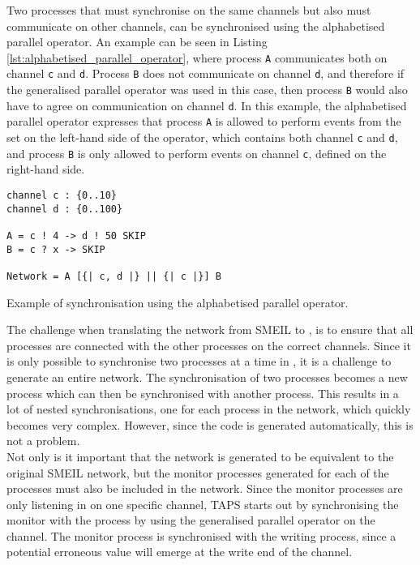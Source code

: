 Two processes that must synchronise on the same channels but also must communicate on other channels, can be synchronised using the alphabetised parallel operator. An example can be seen in Listing \ref{lst:alphabetised_parallel_operator}, where process \texttt{A} communicates both on channel \texttt{c} and \texttt{d}. Process \texttt{B} does not communicate on channel \texttt{d}, and therefore if the generalised parallel operator was used in this case, then process \texttt{B} would also have to agree on communication on channel \texttt{d}. In this example, the alphabetised parallel operator expresses that process \texttt{A} is allowed to perform events from the set on the left-hand side of the operator, which contains both channel \texttt{c} and \texttt{d}, and process \texttt{B} is only allowed to perform events on channel \texttt{c}, defined on the right-hand side.
\begin{listing}
\begin{verbatim}
channel c : {0..10}
channel d : {0..100}

A = c ! 4 -> d ! 50 SKIP
B = c ? x -> SKIP

Network = A [{| c, d |} || {| c |}] B
\end{verbatim}
\caption{Example of synchronisation using the alphabetised parallel operator.}
\label{lst:alphabetised_parallel_operator}
\end{listing}

The challenge when translating the network from SMEIL to \cspm{}, is to ensure that all processes are connected with the other processes on the correct channels.
Since it is only possible to synchronise two processes at a time in \cspm{}, it is a challenge to generate an entire network. The synchronisation of two processes becomes a new process which can then be synchronised with another process. This results in a lot of nested synchronisations, one for each process in the network, which quickly becomes very complex. However, since the \cspm{} code is generated automatically, this is not a problem.\\

Not only is it important that the network is generated to be equivalent to the original SMEIL network, but the monitor processes generated for each of the \cspm{} processes must also be included in the network. Since the monitor processes are only listening in on one specific channel, TAPS starts out by synchronising the monitor with the process by using the generalised parallel operator on the channel. The monitor process is synchronised with the writing process, since a potential erroneous value will emerge at the write end of the channel.\\

